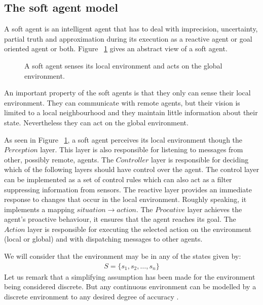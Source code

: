 \subsection{The soft agent model}
\label{subsec:softagentmodel}

A soft agent is an intelligent agent that has to deal with imprecision, uncertainty, partial truth and approximation during its execution as a reactive agent or goal oriented agent or both. Figure ~\ref{fig:softagent} gives an abstract view of a soft agent. 

\begin{figure}[h!]
\centerline{}
      \caption{A soft agent senses its local environment and acts on the global environment.}
\label{fig:softagent}
\end{figure}


An important property of the soft agents is that they only can sense their local environment. They can communicate with remote agents, but their vision is limited to a local neighbourhood and they maintain little information about their state. Nevertheless they can act on the global environment.  

As seen in Figure ~\ref{fig:softagent}, a soft agent perceives its local environment though the $Perception$ layer. This layer is also responsible for listening to  messages from other, possibly remote, agents. The $Controller$ layer is responsible for deciding which of the following layers should have control over the agent. The control layer can be implemented as a set of control rules which can also act as a filter suppressing information from sensors. The reactive layer provides an immediate response to changes that occur in the local environment. Roughly speaking, it implements a mapping $situation \rightarrow action$. The $Procative$ layer achieves the agent's proactive behaviour, it ensures that the agent reaches its goal. The $Action$ layer is responsible for executing the selected action on the environment (local or global) and with dispatching messages to other agents.

We will consider that the environment may be in any of the states given by:
\begin{align}
S=\{s_{1}, s_{2}, \ldots , s_{n} \}
\end{align}
Let us remark that a simplifying assumption has been made for the environment being considered discrete. But any continuous environment can be modelled by a discrete environment to any desired degree of accuracy \cite{Wooldridge09AnIntroduction}.

